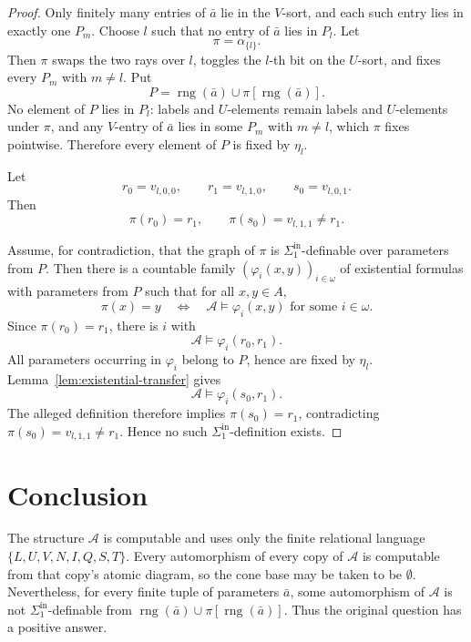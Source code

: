 \documentclass[12pt]{article}
\theoremstyle{definition}
\theoremstyle{remark}
\newcommand{\rng}{\operatorname{rng}}
\begin{document}
\begin{proof}
Only finitely many entries of \(\bar a\) lie in the \(V\)-sort, and each such entry lies in exactly one \(P_m\).  Choose \(l\) such that no entry of \(\bar a\) lies in \(P_l\).  Let
\[
\pi=\alpha_{\{l\}}.
\]
Then \(\pi\) swaps the two rays over \(l\), toggles the \(l\)-th bit on the \(U\)-sort, and fixes every \(P_m\) with \(m\neq l\).  Put
\[
P=\rng(\bar a)\cup \pi[\rng(\bar a)].
\]
No element of \(P\) lies in \(P_l\): labels and \(U\)-elements remain labels and \(U\)-elements under \(\pi\), and any \(V\)-entry of \(\bar a\) lies in some \(P_m\) with \(m\neq l\), which \(\pi\) fixes pointwise.  Therefore every element of \(P\) is fixed by \(\eta_l\).

Let
\[
r_0=v_{l,0,0},\qquad r_1=v_{l,1,0},\qquad s_0=v_{l,0,1}.
\]
Then
\[
\pi(r_0)=r_1,
\qquad
\pi(s_0)=v_{l,1,1}\neq r_1.
\]

Assume, for contradiction, that the graph of \(\pi\) is \(\Sigma^{\mathrm{in}}_1\)-definable over parameters from \(P\).  Then there is a countable family \((\varphi_i(x,y))_{i\in\omega}\) of existential formulas with parameters from \(P\) such that for all \(x,y\in A\),
\[
\pi(x)=y
\quad\Longleftrightarrow\quad
\mathcal A\models\varphi_i(x,y)\text{ for some }i\in\omega.
\]
Since \(\pi(r_0)=r_1\), there is \(i\) with
\[
\mathcal A\models\varphi_i(r_0,r_1).
\]
All parameters occurring in \(\varphi_i\) belong to \(P\), hence are fixed by \(\eta_l\).  Lemma~\ref{lem:existential-transfer} gives
\[
\mathcal A\models\varphi_i(s_0,r_1).
\]
The alleged definition therefore implies \(\pi(s_0)=r_1\), contradicting \(\pi(s_0)=v_{l,1,1}\neq r_1\).  Hence no such \(\Sigma^{\mathrm{in}}_1\)-definition exists.
\end{proof}

\section*{Conclusion}

The structure \(\mathcal A\) is computable and uses only the finite relational language \(\{L,U,V,N,I,Q,S,T\}\).  Every automorphism of every copy of \(\mathcal A\) is computable from that copy's atomic diagram, so the cone base may be taken to be \(\emptyset\).  Nevertheless, for every finite tuple of parameters \(\bar a\), some automorphism of \(\mathcal A\) is not \(\Sigma^{\mathrm{in}}_1\)-definable from \(\rng(\bar a)\cup\pi[\rng(\bar a)]\).  Thus the original question has a positive answer.
\end{document}
